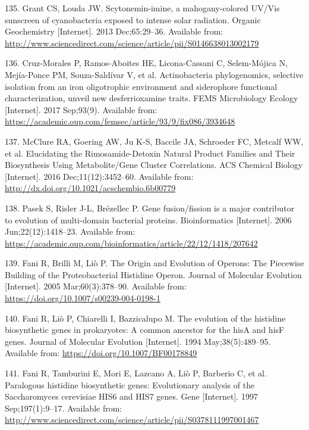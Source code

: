 \documentclass[12pt,twoside]{reedthesis}
\begin{document}
  \hypertarget{ref-grant_scytonemin-imine_2013}{}
  135. Grant CS, Louda JW. Scytonemin-imine, a mahogany-colored UV/Vis
  sunscreen of cyanobacteria exposed to intense solar radiation. Organic
  Geochemistry {[}Internet{]}. 2013 Dec;65:29--36. Available from:
  \url{http://www.sciencedirect.com/science/article/pii/S0146638013002179}
  
  \hypertarget{ref-cruz-morales_actinobacteria_2017}{}
  136. Cruz-Morales P, Ramos-Aboites HE, Licona-Cassani C, Selem-Mójica N,
  Mejía-Ponce PM, Souza-Saldívar V, et al. Actinobacteria phylogenomics,
  selective isolation from an iron oligotrophic environment and
  siderophore functional characterization, unveil new desferrioxamine
  traits. FEMS Microbiology Ecology {[}Internet{]}. 2017 Sep;93(9).
  Available from:
  \url{https://academic.oup.com/femsec/article/93/9/fix086/3934648}
  
  \hypertarget{ref-mcclure_elucidating_2016}{}
  137. McClure RA, Goering AW, Ju K-S, Baccile JA, Schroeder FC, Metcalf
  WW, et al. Elucidating the Rimosamide-Detoxin Natural Product Families
  and Their Biosynthesis Using Metabolite/Gene Cluster Correlations. ACS
  Chemical Biology {[}Internet{]}. 2016 Dec;11(12):3452--60. Available
  from: \url{http://dx.doi.org/10.1021/acschembio.6b00779}
  
  \hypertarget{ref-pasek_gene_2006}{}
  138. Pasek S, Risler J-L, Brézellec P. Gene fusion/fission is a major
  contributor to evolution of multi-domain bacterial proteins.
  Bioinformatics {[}Internet{]}. 2006 Jun;22(12):1418--23. Available from:
  \url{https://academic.oup.com/bioinformatics/article/22/12/1418/207642}
  
  \hypertarget{ref-fani_origin_2005}{}
  139. Fani R, Brilli M, Liò P. The Origin and Evolution of Operons: The
  Piecewise Building of the Proteobacterial Histidine Operon. Journal of
  Molecular Evolution {[}Internet{]}. 2005 Mar;60(3):378--90. Available
  from: \url{https://doi.org/10.1007/s00239-004-0198-1}
  
  \hypertarget{ref-fani_evolution_1994}{}
  140. Fani R, Liò P, Chiarelli I, Bazzicalupo M. The evolution of the
  histidine biosynthetic genes in prokaryotes: A common ancestor for the
  hisA and hisF genes. Journal of Molecular Evolution {[}Internet{]}. 1994
  May;38(5):489--95. Available from:
  \url{https://doi.org/10.1007/BF00178849}
  
  \hypertarget{ref-fani_paralogous_1997}{}
  141. Fani R, Tamburini E, Mori E, Lazcano A, Liò P, Barberio C, et al.
  Paralogous histidine biosynthetic genes: Evolutionary analysis of the
  Saccharomyces cerevisiae HIS6 and HIS7 genes. Gene {[}Internet{]}. 1997
  Sep;197(1):9--17. Available from:
  \url{http://www.sciencedirect.com/science/article/pii/S0378111997001467}
  
\end{document}
